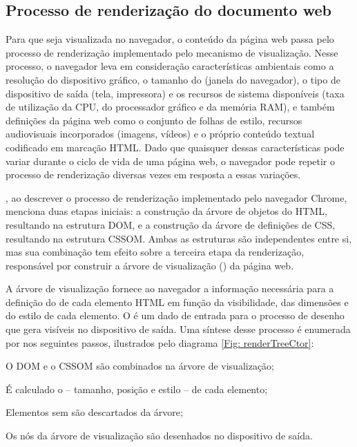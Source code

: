 
\subsection{Processo de renderização do documento web}
Para que seja visualizada no navegador, o conteúdo da página web passa pelo processo de renderização implementado pelo mecanismo de visualização. Nesse processo, o navegador leva em consideração características ambientais como a resolução do dispositivo gráfico, o tamanho do  (janela do navegador), o tipo de dispositivo de saída (tela, impressora) e os recursos de sistema disponíveis (taxa de utilização da CPU, do processador gráfico e da memória RAM), e também definições da página web como o conjunto de folhas de estilo, recursos audiovisuais incorporados (imagens, vídeos) e o próprio conteúdo textual codificado em marcação HTML. Dado que quaisquer dessas características pode variar durante o ciclo de vida de uma página web, o navegador pode repetir o processo de renderização diversas vezes em resposta a essas variações.

, ao descrever o processo de renderização implementado pelo navegador Chrome, menciona duas etapas iniciais: a construção da árvore de objetos do HTML, resultando na estrutura DOM, e a construção da árvore de definições de CSS, resultando na estrutura CSSOM. Ambas as estruturas são independentes entre si, mas sua combinação tem efeito sobre a terceira etapa da renderização, responsável por construir a árvore de visualização () da página web.

A árvore de visualização fornece ao navegador a informação necessária para a definição do  de cada elemento HTML em função da visibilidade, das dimensões e do estilo de cada elemento. O  é um dado de entrada para o processo de desenho que gera  visíveis no dispositivo de saída. Uma síntese desse processo é enumerada por  nos seguintes passos, ilustrados pelo diagrama \ref{Fig: renderTreeCtor}:

\begin{alineas}
	\item O DOM e o CSSOM são combinados na árvore de visualização;
	\item É calculado o  -- tamanho, posição e estilo -- de cada elemento;
	\item Elementos sem  são descartados da árvore;
	\item Os nós da árvore de visualização são desenhados no dispositivo de saída.
\end{alineas}


